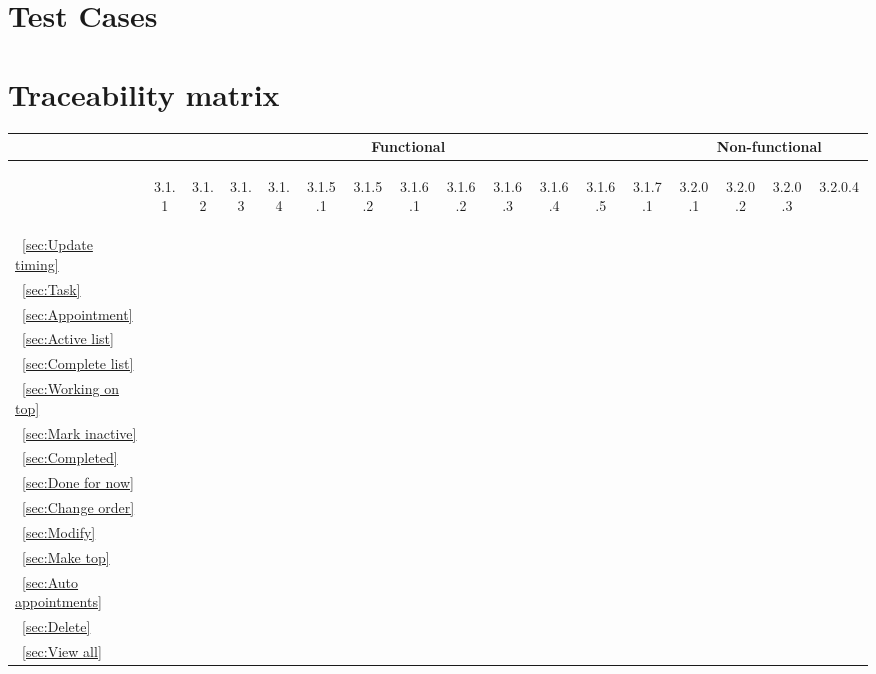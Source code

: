 \documentclass[12pt]{article}
\renewcommand{\c}{\checkmark}
\newcommand{\s}[1] {\begin{sideways}#1\end{sideways}}
\begin{document}
\section{Test Cases}


\section{Traceability matrix}
\begin{center}
\begin{tabular}{|l||*{12}{c|}|*{4}{c|}}
\hline
\multicolumn{1}{|c||}{ }&
\multicolumn{12}{|c||}{Functional} &
\multicolumn{4}{|c|}{Non-functional}\\
\hline
	& \s{3.1.1} & \s{3.1.2} & \s{3.1.3} & \s{3.1.4} & \s{3.1.5.1} & \s{3.1.5.2} & \s{3.1.6.1} & \s{3.1.6.2} & \s{3.1.6.3} & \s{3.1.6.4} & \s{3.1.6.5} & \s{3.1.7.1} & \s{3.2.0.1} & \s{3.2.0.2} & \s{3.2.0.3} & \s{3.2.0.4~~}\\
\hline
\hline
~\ref{sec:Update timing}	&	&	&	&	&	&	&	&	&	&	&	&	&\c	&	&	&	\\
\hline
~\ref{sec:Task}				&\c	&	&	&	&	&	&	&	&	&	&	&	&	&	&	&	\\
\hline
~\ref{sec:Appointment}		&	&\c	&	&	&	&	&	&	&	&	&	&	&	&	&	&	\\
\hline
~\ref{sec:Active list}		&	&	&\c	&	&	&	&	&	&	&	&	&	&	&	&	&	\\
\hline
~\ref{sec:Complete list}	&	&	&	&\c	&	&	&	&	&	&	&	&	&	&\c	&	&	\\
\hline
~\ref{sec:Working on top}	&	&	&	&	&	&	&\c	&	&	&	&	&	&	&	&	&	\\
\hline
~\ref{sec:Mark inactive}	&	&	&	&	&	&	&	&\c	&	&	&	&	&	&	&	&	\\
\hline
~\ref{sec:Completed}		&	&	&	&	&	&	&	&	&\c	&	&	&	&	&	&	&	\\
\hline
~\ref{sec:Done for now}		&	&	&	&	&	&	&	&	&	&\c	&	&	&	&	&	&	\\
\hline
~\ref{sec:Change order}		&	&	&	&	&	&\c	&	&	&	&	&\c	&	&	&	&	&	\\
\hline
~\ref{sec:Modify}			&	&	&	&	&\c	&	&	&	&	&	&	&	&	&	&	&	\\
\hline
~\ref{sec:Make top}			&	&	&	&	&	&\c	&	&	&	&	&	&	&	&	&	&	\\
\hline
~\ref{sec:Auto appointments}&	&	&	&	&	&	&	&	&	&	&	&\c	&\c	&	&	&	\\
\hline
~\ref{sec:Delete}			&	&	&	&	&	&	&	&	&	&	&	&	&	&	&	&\c	\\
\hline
~\ref{sec:View all}			&	&	&	&	&	&	&	&	&	&	&	&	&	&	&\c	&	\\
\hline
\end{tabular}
\end{center}
\end{document}

